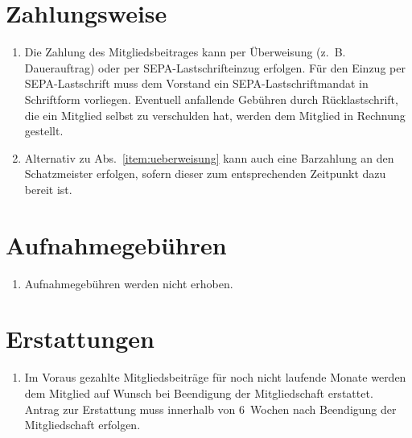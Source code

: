 \documentclass[a4paper,12pt]{scrartcl}
\begin{document}
\section{Zahlungsweise}
\begin{enumerate}
  \item\label{item:ueberweisung} Die Zahlung des Mitgliedsbeitrages kann per
    Überweisung (z.~B. Dauerauftrag) oder per SEPA-Lastschrifteinzug erfolgen. Für
    den Einzug per SEPA-Lastschrift muss dem Vorstand ein SEPA-Lastschriftmandat in
    Schriftform vorliegen. Eventuell anfallende Gebühren durch Rücklastschrift,
    die ein Mitglied selbst zu verschulden hat, werden dem Mitglied in Rechnung
    gestellt.
  \item Alternativ zu Abs.~\ref{item:ueberweisung} kann auch eine Barzahlung an den
    Schatzmeister erfolgen, sofern dieser zum entsprechenden Zeitpunkt dazu
    bereit ist.
\end{enumerate}

\section{Aufnahmegebühren}
\begin{enumerate}
  \item Aufnahmegebühren werden nicht erhoben.
\end{enumerate}

\section{Erstattungen}
\begin{enumerate}
  \item Im Voraus gezahlte Mitgliedsbeiträge für noch nicht laufende Monate
    werden dem Mitglied auf Wunsch bei Beendigung der Mitgliedschaft erstattet.
    Antrag zur Erstattung muss innerhalb von 6~Wochen nach Beendigung der
    Mitgliedschaft erfolgen.
\end{enumerate}
\end{document}
